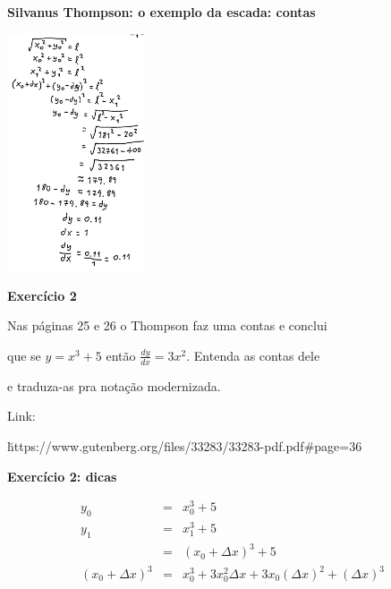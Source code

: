 \documentclass[oneside,12pt]{article}
\begin{document}
\newpage


{\bf Silvanus Thompson: o exemplo da escada: contas}

\msk

\includegraphics[height=7.0cm]{2021-1-C3/20210806_silvanus_escada_contas.pdf}

\newpage


{\bf Exercício 2}


Nas páginas 25 e 26 o Thompson faz uma contas e conclui

que se $y = x^3+5$ então $\frac{dy}{dx} = 3x^2$. Entenda as contas dele

e traduza-as pra notação modernizada.

Link:

\u{https://www.gutenberg.org/files/33283/33283-pdf.pdf\#page=36}


\newpage

{\bf Exercício 2: dicas}

$$\begin{array}{rcl}
  y_0 &=& x_0^3+5 \\
  y_1 &=& x_1^3+5 \\
      &=& (x_0+Δx)^3+5 \\
  (x_0+Δx)^3 &=& x_0^3 + 3x_0^2Δx + 3x_0(Δx)^2 + (Δx)^3 \\
  \end{array}
$$
\end{document}
